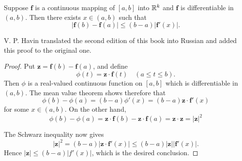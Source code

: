 \begin{thm}
    \label{thm:5.19}
    Suppose $\mathbf{f}$ is a  continuous mapping of $[a, b]$ into ${\protect\mathbb R}^k$
    and $\mathbf{f}$ is differentiable in $(a, b)$.
    Then there exists $x \in (a, b)$ such that
    \begin{equation*}
        \left| \mathbf{f}(b) - \mathbf{f}(a) \right| \leq
        (b-a) \left| \mathbf{f}'(x) \right| .
    \end{equation*}
\end{thm}


V. P. Havin translated the second edition of this book into Russian and added this proof to the original one.
\begin{proof}
    Put $\mathbf{z} = \mathbf{f}(b) - \mathbf{f}(a)$, and define
    \begin{equation*}
        \phi( t ) = \mathbf{z} \cdot \mathbf{f}( t)
        \quad (a \leq t \leq b).
    \end{equation*}
    Then $\phi$ is a real-valued continuous function on $[a, b]$ which is differentiable in $(a, b)$.
    The mean value theorem shows therefore that
    \begin{equation*}
        \phi(b) - \phi(a)
        = (b - a)\phi'(x)
        = (b - a)\mathbf{z} \cdot \mathbf{f}'(x)
    \end{equation*}
    for some $x \in (a, b)$.
    On the other hand,
    \begin{equation*}
        \phi( b) - \phi( a)
        = \mathbf{z} \cdot \mathbf{f}( b) - \mathbf{z} \cdot \mathbf{f}( a)
        = \mathbf{z} \cdot \mathbf{z}
        = \left|  \mathbf{z}  \right|^2
    \end{equation*}

    The Schwarz inequality now gives
    \begin{equation*}
        \left| \mathbf{z} \right|^2
        = (b - a) \left| \mathbf{z} \cdot \mathbf{f}' ( x) \right|
        \leq ( b - a) \left| \mathbf{z} \right| \left| \mathbf{f}'(x) \right| .
    \end{equation*}
    Hence $\left| \mathbf{z} \right| \leq (b - a) \left| f'(x) \right|$, which is the desired conclusion.
\end{proof}